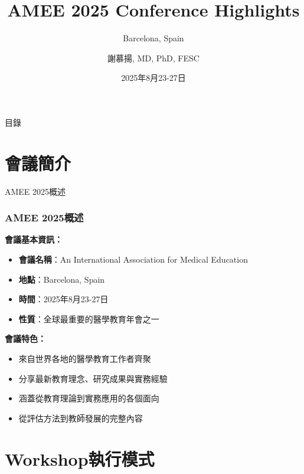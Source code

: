 \documentclass[aspectratio=169]{beamer}
\title{AMEE 2025 Conference Highlights}
\subtitle{Barcelona, Spain}
\author{謝慕揚, MD, PhD, FESC}
\institute{台大醫院新竹分院教學部副主任}
\date{2025年8月23-27日}
\begin{document}
\begin{frame}
\titlepage
\end{frame}

\begin{frame}{目錄}
\tableofcontents
\end{frame}

\section{會議簡介}

\begin{frame}{AMEE 2025概述}
\frametitle{AMEE 2025概述}

\textbf{會議基本資訊：}
\begin{itemize}
    \item \textbf{會議名稱}：An International Association for Medical Education
    \item \textbf{地點}：Barcelona, Spain
    \item \textbf{時間}：2025年8月23-27日
    \item \textbf{性質}：全球最重要的醫學教育年會之一
\end{itemize}

\vspace{0.5cm}

\textbf{會議特色：}
\begin{itemize}
    \item 來自世界各地的醫學教育工作者齊聚
    \item 分享最新教育理念、研究成果與實務經驗
    \item 涵蓋從教育理論到實務應用的各個面向
    \item 從評估方法到教師發展的完整內容
\end{itemize}
\end{frame}

\section{Workshop執行模式}
\end{document}
